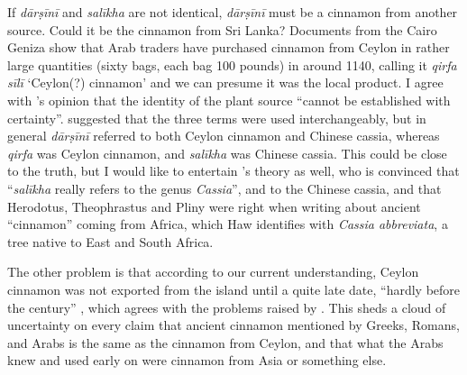 If \textit{dārṣīnī} and \textit{salīkha} are not identical, \textit{dārṣīnī} must be a cinnamon from another source. Could it be the cinnamon from Sri Lanka? Documents from the Cairo Geniza show that Arab traders have purchased cinnamon from Ceylon in rather large quantities (sixty bags, each bag 100 pounds) in around 1140, calling it \textit{qirfa sīlī} `Ceylon(?) cinnamon' \autocites[375]{goitein_india_2008} and we can presume it was the local product. I agree with \textcite{dietrich_dar_2004}'s opinion that the identity of the plant source ``cannot be established with certainty''. \textcite[143-144]{lev_practical_2008} suggested that the three terms were used interchangeably, but in general \textit{dārṣīnī} referred to both Ceylon cinnamon and Chinese cassia, whereas \textit{qirfa} was Ceylon cinnamon, and \textit{salīkha} was Chinese cassia. This could be close to the truth, but I would like to entertain \textcite{haw_cinnamon_2017}'s theory as well, who is convinced that ``\textit{salīkha} really refers to the genus \textit{Cassia}'', and to the Chinese cassia,
and that Herodotus, Theophrastus and Pliny were right when writing about ancient ``cinnamon'' coming from Africa, which Haw identifies with \textit{Cassia abbreviata}, a tree native to East and South Africa.

The other problem is that according to our current understanding, Ceylon cinnamon was not exported from the island until a quite late date, ``hardly before the  century'' \autocite{dietrich_dar_2004}, which agrees with the problems raised by \textcite{haw_cinnamon_2017}. This sheds a cloud of uncertainty on every claim that ancient cinnamon mentioned by Greeks, Romans, and Arabs is the same as the cinnamon from Ceylon, and that what the Arabs knew and used early on were cinnamon from Asia or something else.

